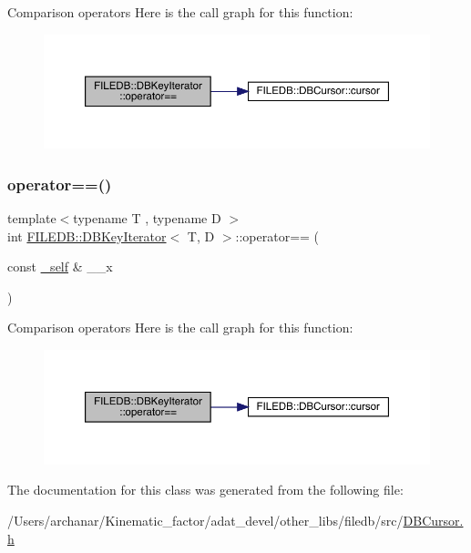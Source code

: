 Comparison operators Here is the call graph for this function\+:
\nopagebreak
\begin{figure}[H]
\begin{center}
\leavevmode
\includegraphics[width=350pt]{d4/d89/classFILEDB_1_1DBKeyIterator_ab6d1aad1d07c4ee9a1edeadf6610c6f4_cgraph}
\end{center}
\end{figure}
\mbox{\label{classFILEDB_1_1DBKeyIterator_ab6d1aad1d07c4ee9a1edeadf6610c6f4}} 
\subsubsection{\texorpdfstring{operator==()}{operator==()}\hspace{0.1cm}{\footnotesize\ttfamily [2/2]}}
{\footnotesize\ttfamily template$<$typename T , typename D $>$ \\
int \mbox{\hyperlink{classFILEDB_1_1DBKeyIterator}{F\+I\+L\+E\+D\+B\+::\+D\+B\+Key\+Iterator}}$<$ T, D $>$\+::operator== (\begin{DoxyParamCaption}\item[{const \mbox{\hyperlink{classFILEDB_1_1DBKeyIterator_aaf7773c7a848ec6e04bc738dd794ace1}{\+\_\+self}} \&}]{\+\_\+\+\_\+x }\end{DoxyParamCaption})\hspace{0.3cm}{\ttfamily [inline]}}

Comparison operators Here is the call graph for this function\+:
\nopagebreak
\begin{figure}[H]
\begin{center}
\leavevmode
\includegraphics[width=350pt]{d4/d89/classFILEDB_1_1DBKeyIterator_ab6d1aad1d07c4ee9a1edeadf6610c6f4_cgraph}
\end{center}
\end{figure}


The documentation for this class was generated from the following file\+:\begin{DoxyCompactItemize}
\item 
/\+Users/archanar/\+Kinematic\+\_\+factor/adat\+\_\+devel/other\+\_\+libs/filedb/src/\mbox{\hyperlink{other__libs_2filedb_2src_2DBCursor_8h}{D\+B\+Cursor.\+h}}\end{DoxyCompactItemize}
